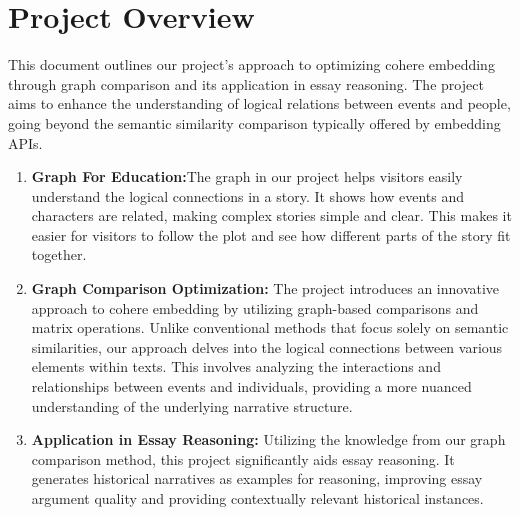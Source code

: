 \documentclass[12pt]{article}
\begin{document}
\section*{Project Overview}

This document outlines our project's approach to optimizing cohere embedding through graph comparison and its application in essay reasoning. The project aims to enhance the understanding of logical relations between events and people, going beyond the semantic similarity comparison typically offered by embedding APIs.

\begin{enumerate}
    \item \textbf{Graph For Education:}The graph in our project helps visitors easily understand the logical connections in a story. It shows how events and characters are related, making complex stories simple and clear. This makes it easier for visitors to follow the plot and see how different parts of the story fit together.
    \item \textbf{Graph Comparison Optimization:} The project introduces an innovative approach to cohere embedding by utilizing graph-based comparisons and matrix operations. Unlike conventional methods that focus solely on semantic similarities, our approach delves into the logical connections between various elements within texts. This involves analyzing the interactions and relationships between events and individuals, providing a more nuanced understanding of the underlying narrative structure.
    
    \item \textbf{Application in Essay Reasoning:} Utilizing the knowledge from our graph comparison method, this project significantly aids essay reasoning. It generates historical narratives as examples for reasoning, improving essay argument quality and providing contextually relevant historical instances.
\end{enumerate}
\end{document}
